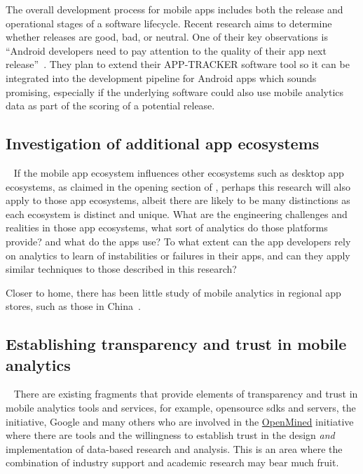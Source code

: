 The overall development process for mobile apps includes both the release and operational stages of a software lifecycle. Recent research aims to determine whether releases are good, bad, or neutral. One of their key observations is ``Android developers need to pay attention to the quality of their app next release''~. They plan to extend their \uppercase{App-Tracker} software tool so it can be integrated into the development pipeline for Android apps which sounds promising, especially if the underlying software could also use mobile analytics data as part of the scoring of a potential release.




\subsection{Investigation of additional app ecosystems}~\label{fw-investigate-additional-ecosystems}
If the mobile app ecosystem influences other ecosystems such as desktop app ecosystems, as claimed in the opening section of , perhaps this research will also apply to those app ecosystems, albeit there are likely to be many distinctions as each ecosystem is distinct and unique.  What are the engineering challenges and realities in those app ecosystems, what sort of analytics do those platforms provide? and what do the apps use? To what extent can the app developers rely on analytics to learn of instabilities or failures in their apps, and can they apply similar techniques to those described in this research? 

Closer to home, there has been little study of mobile analytics in regional app stores, such as those in China~.


\subsection{Establishing transparency and trust in mobile analytics}~\label{fw-establishing-transparency-and-trust-in-mobile-analytics}
There are existing fragments that provide elements of transparency and trust in mobile analytics tools and services, for example, opensource \Glspl{sdk} and servers, the  initiative, Google and many others who are involved in the \href{https://www.openmined.org/}{OpenMined} initiative~ %
where there are tools and the willingness to establish trust in the design \emph{and} implementation of data-based research and analysis. This is an area where the combination of industry support and academic research may bear much fruit. 
